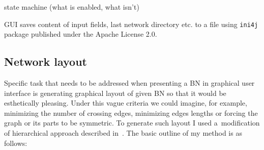 \documentclass[english,cover]{fitthesis} %
\newcommand{\srccode}[1]{{\tt #1}}         %
\newcommand{\todo}[1]{{\color{red}#1}}
\begin{document}
\todo{state machine (what is enabled, what isn't)}

\todo{GUI saves content of input fields, last network directory etc. to a file using \srccode{ini4j} package published under the Apache License 2.0.}

\subsection{Network layout}
Specific task that needs to be addressed when presenting a BN in graphical user interface is generating graphical layout of given BN so that it would be esthetically pleasing. Under this vague criteria we could imagine, for example, minimizing the number of crossing edges, minimizing edges lengths or forcing the graph or its parts to be symmetric. To generate such layout I used a~modification of hierarchical approach described in~\cite[p.~22]{graph_drawing}. The basic outline of my method is as follows:
\end{document}
